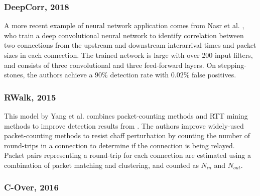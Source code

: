 \documentclass[runningheads,11pt]{llncs}\usepackage[]{graphicx}\usepackage[]{color}
\begin{document}
\subsubsection{DeepCorr, 2018}

A more recent example of neural network application comes from Nasr et al. \cite{nasr2018deepcorr}, who train a deep convolutional neural network to identify correlation between two connections from the upstream and downstream interarrival times and packet sizes in each connection. The trained network is large with over 200 input filters, and consists of three convolutional and three feed-forward layers. %
On stepping-stones, the authors achieve a $90\%$ detection rate with $0.02 \%$ false positives. 


\subsubsection{RWalk, 2015}


This model by Yang et al. \cite{yang2015rtt} combines packet-counting methods and RTT mining methods to improve detection results from \cite{yang2007mining}. 
The authors improve widely-used packet-counting methods to resist chaff perturbation by counting the number of round-trips in a connection to determine if the connection is being relayed.
Packet pairs representing a round-trip for each connection are estimated using a combination of packet matching and clustering, and counted as $N_{in}$ and $N_{out}$. %

\subsubsection{C-Over, 2016}
\end{document}
